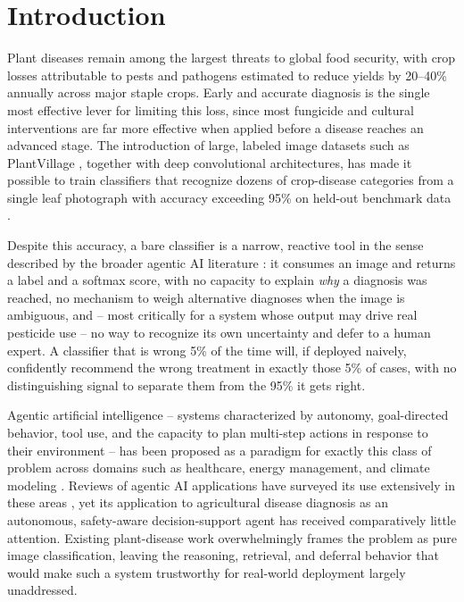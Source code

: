 \documentclass[conference]{IEEEtran}
\begin{document}
\section{Introduction}
\label{sec:intro}

Plant diseases remain among the largest threats to global food security, with crop losses attributable to pests and pathogens estimated to reduce yields by 20--40\% annually across major staple crops. Early and accurate diagnosis is the single most effective lever for limiting this loss, since most fungicide and cultural interventions are far more effective when applied before a disease reaches an advanced stage. The introduction of large, labeled image datasets such as PlantVillage \cite{r_hughes2015}, together with deep convolutional architectures, has made it possible to train classifiers that recognize dozens of crop-disease categories from a single leaf photograph with accuracy exceeding 95\% on held-out benchmark data \cite{r_mohanty2016}.

Despite this accuracy, a bare classifier is a narrow, reactive tool in the sense described by the broader agentic AI literature \cite{b1,b9}: it consumes an image and returns a label and a softmax score, with no capacity to explain \emph{why} a diagnosis was reached, no mechanism to weigh alternative diagnoses when the image is ambiguous, and -- most critically for a system whose output may drive real pesticide use -- no way to recognize its own uncertainty and defer to a human expert. A classifier that is wrong 5\% of the time will, if deployed naively, confidently recommend the wrong treatment in exactly those 5\% of cases, with no distinguishing signal to separate them from the 95\% it gets right.

Agentic artificial intelligence -- systems characterized by autonomy, goal-directed behavior, tool use, and the capacity to plan multi-step actions in response to their environment -- has been proposed as a paradigm for exactly this class of problem across domains such as healthcare, energy management, and climate modeling \cite{b1,b3,b6,b13,b14}. Reviews of agentic AI applications have surveyed its use extensively in these areas \cite{b2,b5,b10}, yet its application to agricultural disease diagnosis as an autonomous, safety-aware decision-support agent has received comparatively little attention. Existing plant-disease work overwhelmingly frames the problem as pure image classification, leaving the reasoning, retrieval, and deferral behavior that would make such a system trustworthy for real-world deployment largely unaddressed.
\end{document}
